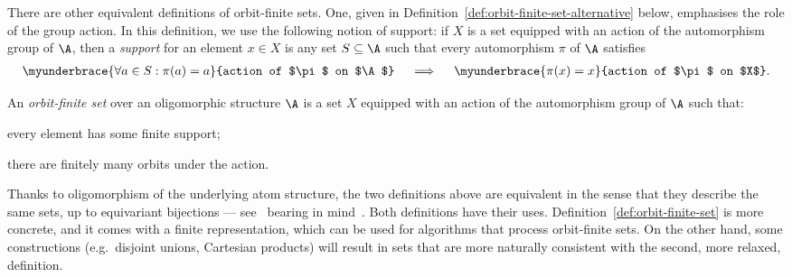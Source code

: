 There are other equivalent definitions of orbit-finite sets. 
One, given in Definition~\ref{def:orbit-finite-set-alternative} below, emphasises the role of the group action. 
In this definition, we use the following notion of support: 
if $X$ is a set equipped with an action of the automorphism group of $\A$, 
then a \emph{support} for an element $x \in X$ is any set $S \subseteq \A$ such that every automorphism $\pi$ of $\A$ satisfies
\begin{align*}
   \myunderbrace{\forall a \in S : \pi(a)=a}{action of $\pi$ on $\A$}
   \quad \implies \quad 
   \myunderbrace{\pi(x)=x}{action of $\pi$ on $X$}.
\end{align*}
\begin{definition}
    \label{def:orbit-finite-set-alternative} An \emph{orbit-finite set} over an oligomorphic structure $\A$ is a set $X$ equipped with an action of the automorphism group of $\A$ such that: 
   \begin{bracketenumerate}
      \item every element has some finite support;
      \item there are finitely many orbits under the action.
   \end{bracketenumerate}
\end{definition}

Thanks to oligomorphism of the underlying atom structure, the two definitions above are equivalent 
in the sense that they describe the same sets, up to equivariant bijections --- see~\cite[Thm.~5.12]{bojanczyk_slightly} bearing in mind~\cite[Prop.~2.19]{BodirskyBodorMarimon_25}. 
Both definitions have their uses. 
Definition~\ref{def:orbit-finite-set} is more concrete, and it comes with a finite representation, which can be used for algorithms that process orbit-finite sets. 
On the other hand, some constructions (e.g.~disjoint unions, Cartesian products) will result in sets that are more naturally consistent with the second, more relaxed, definition. 
